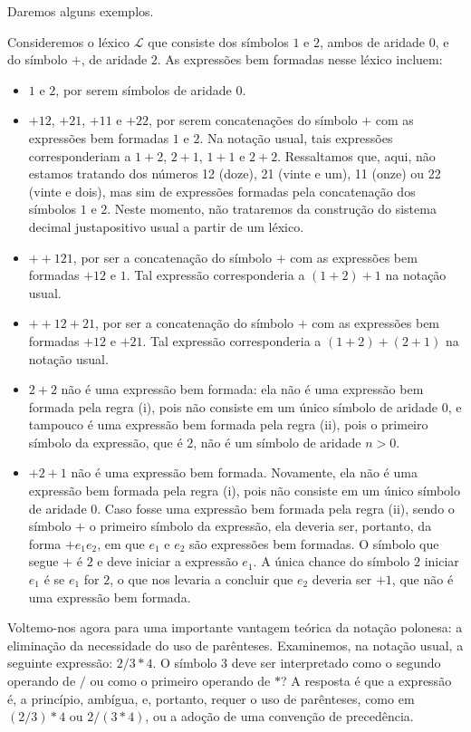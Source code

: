 Daremos alguns exemplos.
\begin{example}\label{exa:expressoesBemFormadas}
Consideremos o léxico $\mathcal L$ que consiste dos símbolos $1$ e $2$, ambos de aridade $0$, e do símbolo $+$, de aridade $2$.
As expressões bem formadas nesse léxico incluem:

\begin{itemize}
    \item $1$ e $2$, por serem símbolos de aridade $0$.
    \item $+12$, $+21$, $+11$ e $+22$, por serem concatenações do símbolo $+$ com as expressões bem formadas $1$ e $2$.
    Na notação usual, tais expressões corresponderiam a $1+2$, $2+1$, $1+1$ e $2+2$.
    Ressaltamos que, aqui, não estamos tratando dos números 12 (doze), 21 (vinte e um), 11 (onze) ou 22 (vinte e dois), mas sim de expressões formadas pela concatenação dos símbolos $1$ e $2$.
    Neste momento, não trataremos da construção do sistema decimal justapositivo usual a partir de um léxico.
    \item ${+}{+}121$, por ser a concatenação do símbolo $+$ com as expressões bem formadas $+12$ e $1$.
    Tal expressão corresponderia a $(1+2)+1$ na notação usual.
    \item $+{+}12{+}21$, por ser a concatenação do símbolo $+$ com as expressões bem formadas $+12$ e $+21$.
    Tal expressão corresponderia a $(1+2)+(2+1)$ na notação usual.
    \item $2{+}2$ não é uma expressão bem formada: ela não é uma expressão bem formada pela regra (i), pois não consiste em um único símbolo de aridade $0$, e tampouco é uma expressão bem formada pela regra (ii), pois o primeiro símbolo da expressão, que é $2$, não é um símbolo de aridade $n>0$.
    \item $+2{+}1$ não é uma expressão bem formada.
    Novamente, ela não é uma expressão bem formada pela regra (i), pois não consiste em um único símbolo de aridade $0$.
    Caso fosse uma expressão bem formada pela regra (ii), sendo o símbolo $+$ o primeiro símbolo da expressão, ela deveria ser, portanto, da forma $+e_1e_2$, em que $e_1$ e $e_2$ são expressões bem formadas.
    O símbolo que segue $+$ é $2$ e deve iniciar a expressão $e_1$.
    A única chance do símbolo $2$ iniciar $e_1$ é se $e_1$ for $2$, o que nos levaria a concluir que $e_2$ deveria ser $+1$, que não é uma expressão bem formada.
\end{itemize}
\end{example}

Voltemo-nos agora para uma importante vantagem teórica da notação polonesa: a eliminação da necessidade do uso de parênteses.
Examinemos, na notação usual, a seguinte expressão: $2/3\ast 4$.
O símbolo $3$ deve ser interpretado como o segundo operando de $/$ ou como o primeiro operando de $\ast$?
A resposta é que a expressão é, a princípio, ambígua, e, portanto, requer o uso de parênteses, como em $(2/3)\ast 4$ ou $2/(3\ast 4)$, ou a adoção de uma convenção de precedência.

